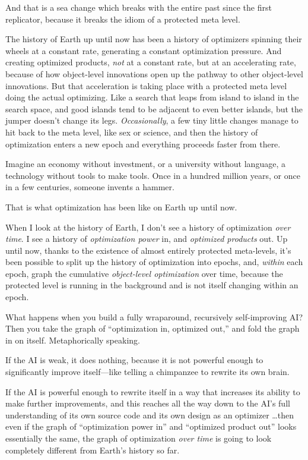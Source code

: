 {
 And that is a sea change which breaks with the entire past since
the first replicator, because it breaks the idiom of a protected meta
level.}

{
 The history of Earth up until now has been a history of optimizers
spinning their wheels at a constant rate, generating a constant
optimization pressure. And creating optimized products, \textit{not} at
a constant rate, but at an accelerating rate, because of how
object-level innovations open up the pathway to other object-level
innovations. But that acceleration is taking place with a protected
meta level doing the actual optimizing. Like a search that leaps from
island to island in the search space, and good islands tend to be
adjacent to even better islands, but the jumper doesn't
change its legs. \textit{Occasionally}, a few tiny little changes
manage to hit back to the meta level, like sex or science, and then the
history of optimization enters a new epoch and everything proceeds
faster from there.}

{
 Imagine an economy without investment, or a university without
language, a technology without tools to make tools. Once in a hundred
million years, or once in a few centuries, someone invents a hammer.}

{
 That is what optimization has been like on Earth up until now.}

{
 When I look at the history of Earth, I don't see a
history of optimization \textit{over time}. I see a history of
\textit{optimization power} in, and \textit{optimized products} out. Up
until now, thanks to the existence of almost entirely protected
meta-levels, it's been possible to split up the history
of optimization into epochs, and, \textit{within} each epoch, graph the
cumulative \textit{object-level optimization} over time, because the
protected level is running in the background and is not itself changing
within an epoch.}

{
 What happens when you build a fully wraparound, recursively
self-improving AI? Then you take the graph of
``optimization in, optimized out,''
and fold the graph in on itself. Metaphorically speaking.}

{
 If the AI is weak, it does nothing, because it is not powerful
enough to significantly improve itself---like telling a chimpanzee to
rewrite its own brain.}

{
 If the AI is powerful enough to rewrite itself in a way that
increases its ability to make further improvements, and this reaches
all the way down to the AI's full understanding of its
own source code and its own design as an optimizer \ldots then even if
the graph of ``optimization power
in'' and ``optimized product
out'' looks essentially the same, the graph of
optimization \textit{over time} is going to look completely different
from Earth's history so far.}

